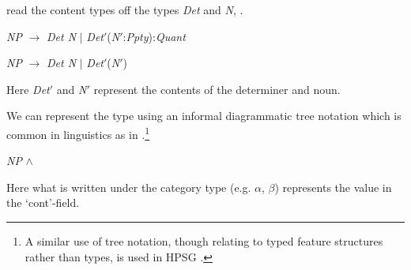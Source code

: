read the content types off the types \textit{Det} and \textit{N}, .
\begin{ex}
  \begin{subex}
  \item \textit{NP} $\longrightarrow$ \textit{Det N} $\mid$
    \textit{Det}$'$(\textit{N}$'$:\textit{Ppty}):\textit{Quant}
    
  \item \textit{NP} $\longrightarrow$ \textit{Det N} $\mid$
    \textit{Det}$'$(\textit{N}$'$)
  \end{subex}
  

\end{ex} 
Here \textit{Det}$'$ and \textit{N}$'$ represent the contents of the
determiner and noun.
  
We can represent the type  using an informal diagrammatic
tree notation which is common in linguistics as in
.\footnote{A similar use of tree notation, though relating
  to typed feature structures rather than types, is used in HPSG
  \citep[see, for example,][Chapter~2]{GinzburgSag2000}.}
\begin{ex} 
\begin{subex} 
 
\item \hspace*{1em}\textit{NP} \d{$\wedge$}


 
\item {}
 
\end{subex} 
   
\end{ex}
Here what is written under the category type (e.g. $\alpha$, $\beta$) represents the value in
the `cont'-field. 
     
